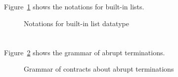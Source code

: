 

\section{}

\subsection{}
\nodiff

\subsection{}
\nodiff

Figure~\ref{fig:gram:list} shows the notations for built-in lists.
\begin{figure}[t]
  \begin{cadre}
      
    \end{cadre}
  \caption{Notations for built-in list datatype}
\label{fig:gram:list}
\end{figure}


\section{}
\label{sec:abrupt}

\nodiff

Figure~\ref{fig:gram:abrupt} shows the grammar of abrupt terminations.

\begin{figure}[htbp]
  \begin{cadre}
    
  \end{cadre}
  \caption{Grammar of contracts about abrupt terminations}
  \label{fig:gram:abrupt}
\end{figure}

